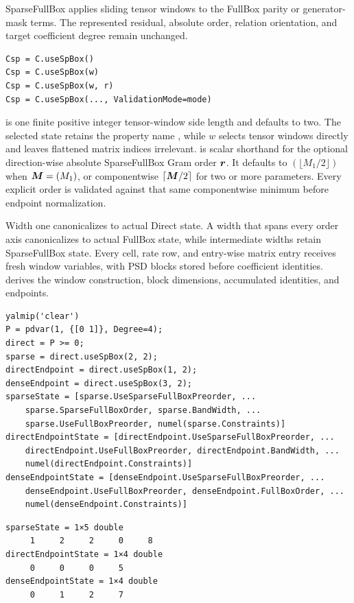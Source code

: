 SparseFullBox applies sliding tensor windows to the FullBox parity or generator-mask terms. The represented residual, absolute order, relation orientation, and target coefficient degree remain unchanged.

\syntaxhead
\begin{lstlisting}[style=dpsyntax]
Csp = C.useSpBox()
Csp = C.useSpBox(w)
Csp = C.useSpBox(w, r)
Csp = C.useSpBox(..., ValidationMode=mode)
\end{lstlisting}

\arghead
{} is one finite positive integer tensor-window side length and defaults to two. The selected state retains the property name , while $w$ selects tensor windows directly and leaves flattened matrix indices irrelevant.  is scalar shorthand for the optional direction-wise absolute SparseFullBox Gram order $\boldsymbol{r}$. It defaults to $(\lfloor M_1/2\rfloor)$ when $\boldsymbol{M}=(M_1)$, or componentwise $\lceil\boldsymbol{M}/2\rceil$ for two or more parameters. Every explicit order is validated against that same componentwise minimum before endpoint normalization.

\descriptionhead
Width one canonicalizes to actual Direct state. A width that spans every order axis canonicalizes to actual FullBox state, while intermediate widths retain SparseFullBox state. Every cell, rate row, and entry-wise matrix entry receives fresh window variables, with PSD blocks stored before coefficient identities.  derives the window construction, block dimensions, accumulated identities, and endpoints.

\examplehead
\begin{lstlisting}[style=dpmatlab]
yalmip('clear')
P = pdvar(1, {[0 1]}, Degree=4);
direct = P >= 0;
sparse = direct.useSpBox(2, 2);
directEndpoint = direct.useSpBox(1, 2);
denseEndpoint = direct.useSpBox(3, 2);
sparseState = [sparse.UseSparseFullBoxPreorder, ...
    sparse.SparseFullBoxOrder, sparse.BandWidth, ...
    sparse.UseFullBoxPreorder, numel(sparse.Constraints)]
directEndpointState = [directEndpoint.UseSparseFullBoxPreorder, ...
    directEndpoint.UseFullBoxPreorder, directEndpoint.BandWidth, ...
    numel(directEndpoint.Constraints)]
denseEndpointState = [denseEndpoint.UseSparseFullBoxPreorder, ...
    denseEndpoint.UseFullBoxPreorder, denseEndpoint.FullBoxOrder, ...
    numel(denseEndpoint.Constraints)]
\end{lstlisting}
\begin{lstlisting}[style=dpoutput]
sparseState = 1×5 double
     1     2     2     0     8
directEndpointState = 1×4 double
     0     0     0     5
denseEndpointState = 1×4 double
     0     1     2     7
\end{lstlisting}

